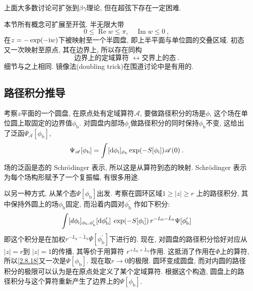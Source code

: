上面大多数讨论可扩张到$\beta\gamma$理论, 但在超弦下存在一定困难. 

本节所有概念可扩展至开弦. 半无限大带
\begin{equation}
0 \leq \operatorname{Re} w \leq \pi, \quad \operatorname{Im} w \leq 0 \:, \label{2.8.15}
\end{equation}
在$z=-\exp (-\mathrm{i} w)$下被映射至一个半圆盘, 即上半平面与单位圆的交叠区域. 初态又一次映射至原点, 其在边界上, 所以存在同构
\begin{equation}
\text {边界上的定域算符 } \leftrightarrow \text {交界上的态} \:. \label{2.8.16}
\end{equation}
细节与之上相同. 镜像法(doubling trick)在围道讨论中是有用的.

\subsection*{路径积分推导}
考察$z$平面的一个圆盘, 在原点处有定域算符$\mathscr{A}$, 要做路径积分的场是$\phi$, 这个场在单位圆上取固定的边界值$\phi_{\mathrm{b}}$. 
对圆盘内部场$\phi_i$做路径积分的同时保持$\phi_{\mathrm{b}}$不变, 这给出了泛函$\Psi_{\mathscr{A}}[\phi_{\mathrm{b}}]$,
\begin{equation}
	\Psi_{\mathscr{A}}[\phi_{\mathrm{b}}]=\int[\mathrm{d}  \phi_{\mathrm{i}}]_{\phi_{\mathrm{b}}} 
	\exp (-S[\phi_{\mathrm{i}}]) \mathscr{A}(0) \:. \label{2.8.17}
\end{equation}
场的泛函是态的 Schr\"{o}dinger 表示, 所以这是从算符到态的映射. Schr\"{o}dinger 表示为每个场构形赋予了一个复振幅, 有很多用途.

以另一种方式, 从某个态$\Psi[\phi_{\mathrm{b}}]$出发. 考察在圆环区域$1 \geq |z| \geq r$ 上的路径积分, 
其中保持外圆上的场$\phi_{\mathrm{b}}$固定, 而沿着内圆对$\phi_{\mathrm{b}}^\prime$ 作如下积分:
\begin{equation}\label{2.8.18}
\int [d \phi_{\mathrm{i}}]_{\phi_{\mathrm{b}}, \phi_{\mathrm{b}}^{\prime}} [\mathrm{d} \phi_{\mathrm{b}}^{\prime}]\:
  \exp (-S[\phi_{\mathrm{i}}])\, r^{-L_{0}-\tilde{L}_{0}} \Psi[\phi_{\mathrm{b}}^{\prime}]
\end{equation}
即这个积分是在加权$r^{-L_{0}-\tilde{L}_{0}} \Psi[\phi_{\mathrm{b}}^{\prime}]$下进行的. 现在, 
对圆盘的路径积分恰好对应从 $|z|=r$到 $|z|=1$的传播, 其等价于用算符 $r^{+L_{0}+\tilde{L}_{0}}$作用. 这抵消了作用在$\Phi$上的算符, 所以\eqref{2.8.18}又一次是$\Psi[\phi_{\mathrm{b}}]$. 现在取$r\to 0$的极限. 圆环变成圆盘, 而对内圆的路径积分的极限可以认为是在原点处定义了某个定域算符. 根据这个构造, 圆盘上的路径积分与这个算符重新产生了边界上的$\Psi[\phi_{\mathrm{b}}]$. 

